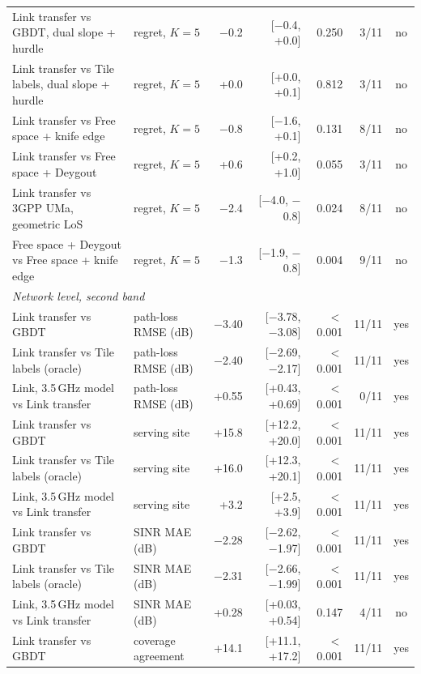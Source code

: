\begin{tabular}{llrrrrc}
Link transfer vs GBDT, dual slope + hurdle & regret, $K{=}5$ & \ensuremath{-}0.2 & [\ensuremath{-}0.4, +0.0] & 0.250 & 3/11 & no \\
Link transfer vs Tile labels, dual slope + hurdle & regret, $K{=}5$ & +0.0 & [+0.0, +0.1] & 0.812 & 3/11 & no \\
Link transfer vs Free space + knife edge & regret, $K{=}5$ & \ensuremath{-}0.8 & [\ensuremath{-}1.6, +0.1] & 0.131 & 8/11 & no \\
Link transfer vs Free space + Deygout & regret, $K{=}5$ & +0.6 & [+0.2, +1.0] & 0.055 & 3/11 & no \\
Link transfer vs 3GPP UMa, geometric LoS & regret, $K{=}5$ & \ensuremath{-}2.4 & [\ensuremath{-}4.0, \ensuremath{-}0.8] & 0.024 & 8/11 & no \\
Free space + Deygout vs Free space + knife edge & regret, $K{=}5$ & \ensuremath{-}1.3 & [\ensuremath{-}1.9, \ensuremath{-}0.8] & 0.004 & 9/11 & no \\
\multicolumn{7}{l}{\emph{Network level, second band}} \\
Link transfer vs GBDT & path-loss RMSE (dB) & \ensuremath{-}3.40 & [\ensuremath{-}3.78, \ensuremath{-}3.08] & $<$0.001 & 11/11 & yes \\
Link transfer vs Tile labels (oracle) & path-loss RMSE (dB) & \ensuremath{-}2.40 & [\ensuremath{-}2.69, \ensuremath{-}2.17] & $<$0.001 & 11/11 & yes \\
Link, 3.5\,GHz model vs Link transfer & path-loss RMSE (dB) & +0.55 & [+0.43, +0.69] & $<$0.001 & 0/11 & yes \\
Link transfer vs GBDT & serving site & +15.8 & [+12.2, +20.0] & $<$0.001 & 11/11 & yes \\
Link transfer vs Tile labels (oracle) & serving site & +16.0 & [+12.3, +20.1] & $<$0.001 & 11/11 & yes \\
Link, 3.5\,GHz model vs Link transfer & serving site & +3.2 & [+2.5, +3.9] & $<$0.001 & 11/11 & yes \\
Link transfer vs GBDT & SINR MAE (dB) & \ensuremath{-}2.28 & [\ensuremath{-}2.62, \ensuremath{-}1.97] & $<$0.001 & 11/11 & yes \\
Link transfer vs Tile labels (oracle) & SINR MAE (dB) & \ensuremath{-}2.31 & [\ensuremath{-}2.66, \ensuremath{-}1.99] & $<$0.001 & 11/11 & yes \\
Link, 3.5\,GHz model vs Link transfer & SINR MAE (dB) & +0.28 & [+0.03, +0.54] & 0.147 & 4/11 & no \\
Link transfer vs GBDT & coverage agreement & +14.1 & [+11.1, +17.2] & $<$0.001 & 11/11 & yes \\

\end{tabular}
